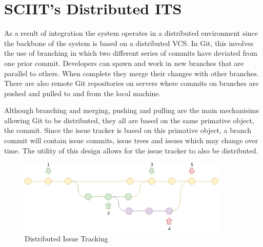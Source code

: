 \documentclass{mproj}
\begin{document}








\section{SCIIT's Distributed ITS}

As a result of integration the system operates in a distributed environment since the backbone of the system is based on a distributed VCS. In Git, this involves the use of branching in which two different series of commits have deviated from one prior commit. Developers can spawn and work in new branches that are parallel to others. When complete they merge their changes with other branches. There are also remote Git repositories on servers where commits on branches are pushed and pulled to and from the local machine. 

Although branching and merging, pushing and pulling are the main mechanisims allowing Git to be distributed, they all are based on the same primative object, the commit. Since the issue tracker is based on this primative object, a branch commit will contain issue commits, issue trees and issues which may change over time. The utility of this design allows for the issue tracker to also be distributed.


\begin{figure}[t]
\caption{Distributed Issue Tracking}
\label{fig:distributed-issue-tracking}
\centering
\includegraphics[width=10cm]{distributed-issue-tracking}
\end{figure}
\end{document}
